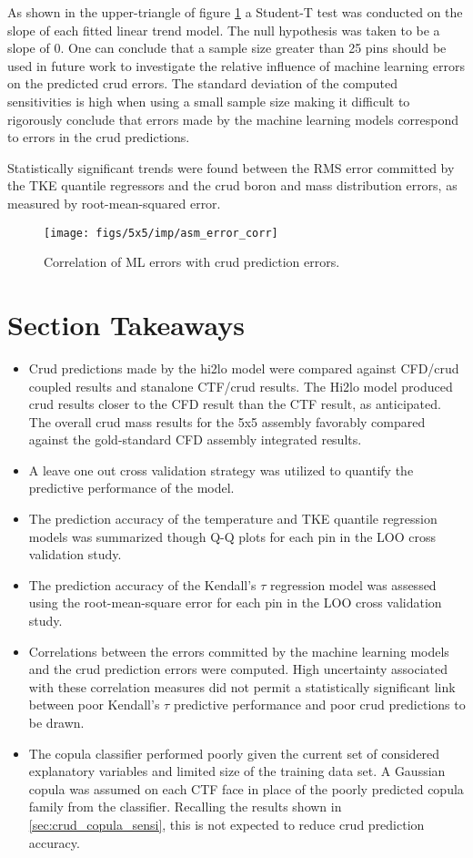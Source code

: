As shown in the upper-triangle of figure \ref{fig:asmerrorcorr} a Student-T test was conducted on the slope of each fitted linear trend model.  The null hypothesis was taken to be a slope of 0.  One can conclude that a  sample size greater than 25 pins should be used in future work to investigate the relative influence of machine learning errors on the predicted crud errors.  The standard deviation of the computed sensitivities is high when using a small sample size making it difficult to rigorously conclude that errors made by the machine learning models correspond to errors in the crud predictions.

Statistically significant trends were found between the RMS error committed by the TKE quantile regressors and the crud boron and mass distribution errors, as measured by root-mean-squared error.

\begin{figure}[H]
    \centering
    \texttt{[image: figs/5x5/imp/asm\_error\_corr]}
    \caption{Correlation of ML errors with crud prediction errors.}
    \label{fig:asmerrorcorr}
\end{figure}

\section{Section Takeaways}


\begin{itemize}
    \item Crud predictions made by the hi2lo model were compared against CFD/crud coupled results and stanalone CTF/crud results.  The Hi2lo model produced crud results closer to the CFD result than the CTF result, as anticipated.  The overall crud mass results for the 5x5 assembly favorably compared against the gold-standard CFD assembly integrated results.
    \item A leave one out cross validation strategy was utilized to quantify the predictive performance of the model.
    \item The prediction accuracy of the temperature and TKE quantile regression models was summarized though Q-Q plots for each pin in the LOO cross validation study.
    \item The prediction accuracy of the Kendall's $\tau$ regression model was assessed using the root-mean-square error for each pin in the LOO cross validation study.  \item Correlations between the errors committed by the machine learning models and the crud prediction errors were computed.  High uncertainty associated with these correlation measures did not permit a statistically significant link between poor Kendall's $\tau$ predictive performance and poor crud predictions to be drawn.
        \item The copula classifier performed poorly given the current set of considered explanatory variables and limited size of the training data set.  A Gaussian copula was assumed on each CTF face in place of the poorly predicted copula family from the classifier.  Recalling the results shown in \ref{sec:crud_copula_sensi}, this is not expected to reduce crud prediction accuracy.
\end{itemize}
